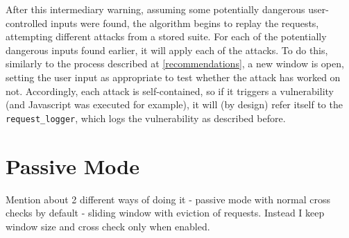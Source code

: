 After this intermediary warning, assuming some potentially dangerous user-controlled inputs were found, the algorithm begins to replay the requests, attempting different attacks from a stored suite. For each of the potentially dangerous inputs found earlier, it will apply each of the attacks. To do this, similarly to the process described at \ref{recommendations}, a new window is open, setting the user input as appropriate to test whether the attack has worked on not. Accordingly, each attack is self-contained, so if it triggers a vulnerability (and Javascript was executed for example), it will (by design) refer itself to the \texttt{request\_logger}, which logs the vulnerability as described before.


\section{Passive Mode}



Mention about 2 different ways of doing it - passive mode with normal cross checks by default - sliding window with eviction of requests.
Instead I keep window size and cross check only when enabled.

